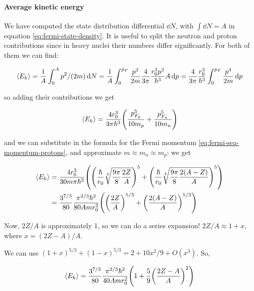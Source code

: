 \documentclass{article}
\begin{document}
\paragraph{Average kinetic energy}

We have computed the state distribution differential \(\dd{N} \), with \(\int   \dd{N}  = A\) in equation \eqref{eq:fermi-state-density}. It is useful to split the neutron and proton contributions since in heavy nuclei their numbers differ significantly.
For both of them we can find:

\begin{equation}
    \expval{E_k}
    = \frac{1}{A} \int _{0}   ^{A} p^2 /(2m) \dd{N}
    = \frac{1}{A} \int _{0}   ^{p_F} \frac{p^2}{2m} \frac{4}{3 \pi} \frac{r_0^3 p^2}{\hbar^3} A \dd{p}
    = \frac{4}{3 \pi} \frac{r_0^3 }{\hbar^3} \int _{0}   ^{p_F} \frac{p^4}{2m} \dd{p}
\end{equation}

so adding their contributions we get

\begin{equation}
    \expval{E_k} = \frac{4 r_0^3}{3 \pi \hbar^3} \qty(\frac{p_{F_p}^5}{10 m_p} + \frac{p_{F_n}^5}{10 m_n})
\end{equation}

and we can substitute in the formula for the Fermi momentum \eqref{eq:fermi-sea-momentum-protons}, and approximate \(m \approx  m_n \approx  m_p\): we get

\begin{subequations}
\begin{align}
    \expval{E_k}
    &= \frac{4 r_0^3}{30 m \pi \hbar^3} \qty(\qty(\frac{\hbar}{r_0} \sqrt[3]{\frac{9 \pi }{8} \frac{2Z}{A}})^5 + \qty(\frac{\hbar}{r_0} \sqrt[3]{\frac{9 \pi }{8} \frac{2(A-Z)}{A}})^5)  \\
    &= \frac{3^{7/3}}{80} \frac{\pi^{2/3} \hbar^2}{80 Am r_0^2} \qty(\qty(\frac{2Z}{A})^{5/3} + \qty(\frac{2(A-Z)}{A})^{5/3})
\end{align}
\end{subequations}

Now, \(2Z/A\) is approximately 1, so we can do a series expansion! \(2Z/A \approx 1+x\), where \(x = (2Z-A)/A\).

We can use \((1+x)^{5/3} + (1-x)^{5/3} = 2 + 10x^2/9 + O(x^3)\). So,

\begin{equation}
    \expval{E_k} =  \frac{3^{7/3}}{80} \frac{\pi^{2/3} \hbar^2}{40 Am r_0^2} \qty(1 + \frac{5}{9} \qty(\frac{2Z-A}{A})^2)
\end{equation}
\end{document}
